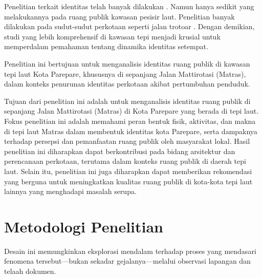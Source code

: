 \documentclass[11pt]{simart} %
\begin{document}
Penelitian terkait identitas telah banyak dilakukan \citep{oktay2015}. Namun hanya sedikit yang melakukannya pada ruang publik kawasan pesisir laut. Penelitian banyak dilakukan pada sudut-sudut perkotaan seperti jalan trotoar \citep{wanismail2018}.
Dengan demikian, studi yang lebih komprehensif di kawasan tepi menjadi krusial untuk memperdalam pemahaman tentang dinamika identitas setempat.

\begin{comment}
hanya sedikit yang melakukannya pada ruang publik kawasan pesisir laut.
Ruang publik ini lebih bernilai karena memiliki keanekaragaman karakter yang ditimbulkan oleh letaknya yang berdekatan dengan laut.
Selain itu, memiliki kontribusi besar terhadap pengembangan sebuah kota \citep{hussein2014}. \cite{hussein2014} menekankan bahwa ruang publik pesisir laut yang berhasil mampu membawa masyarakat perkotaan ke pesisir laut. Salah satu caranya adalah memperkuat identitas ruang-ruang publik tersebut \citep{oktay2002}.
\end{comment}

Penelitian ini bertujuan untuk menganalisis identitas ruang publik di kawasan tepi laut Kota Parepare, khususnya di sepanjang Jalan Mattirotasi (Matras), dalam konteks penurunan identitas perkotaan akibat pertumbuhan penduduk.

Tujuan dari penelitian ini adalah untuk menganalisis identitas ruang publik di sepanjang Jalan Mattirotasi (Matras) di Kota Parepare yang berada di tepi laut.
Fokus penelitian ini adalah memahami peran bentuk fisik, aktivitas, dan makna di tepi laut Matras dalam membentuk identitas kota Parepare, serta dampaknya terhadap persepsi dan pemanfaatan ruang publik oleh masyarakat lokal.
Hasil penelitian ini diharapkan dapat berkontribusi pada bidang arsitektur dan perencanaan perkotaan, terutama dalam konteks ruang publik di daerah tepi laut.
Selain itu, penelitian ini juga diharapkan dapat memberikan rekomendasi yang berguna untuk meningkatkan kualitas ruang publik di kota-kota tepi laut lainnya yang menghadapi masalah serupa.


% 

\section{Metodologi Penelitian}
Desain ini memungkinkan eksplorasi mendalam terhadap proses yang mendasari fenomena tersebut—bukan sekadar gejalanya—melalui observasi lapangan dan telaah dokumen.
\end{document}
